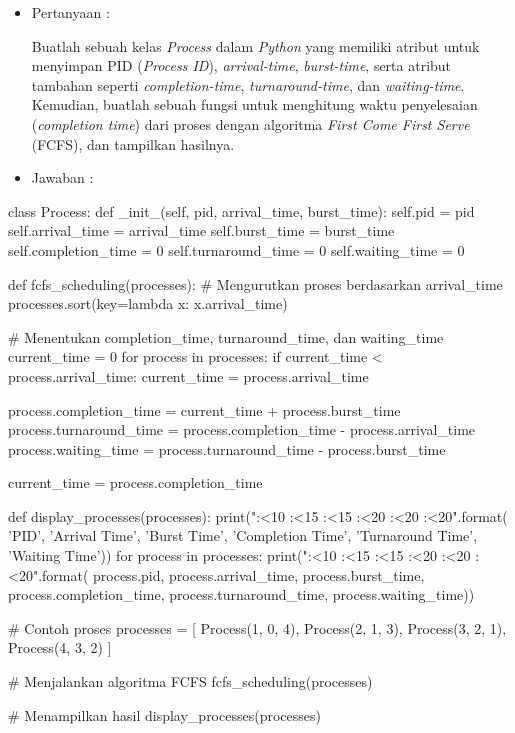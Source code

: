 \documentclass[12pt]{article}
\begin{document}
\begin{itemize}
    \item Pertanyaan :

    Buatlah sebuah kelas \textit{Process} dalam \textit{Python} yang memiliki atribut untuk menyimpan PID (\textit{Process ID}), \textit{arrival-time}, \textit{burst-time}, serta atribut tambahan seperti \textit{completion-time}, \textit{turnaround-time}, dan \textit{waiting-time}. Kemudian, buatlah sebuah fungsi untuk menghitung waktu penyelesaian (\textit{completion time}) dari proses dengan algoritma \textit{First Come First Serve} (FCFS), dan tampilkan hasilnya.
\end{itemize}
\begin{itemize}
 \item Jawaban :
\end{itemize}
\begin{python}
class Process:
def _init_(self, pid, arrival_time, burst_time):
        self.pid = pid
        self.arrival_time = arrival_time
        self.burst_time = burst_time
        self.completion_time = 0
        self.turnaround_time = 0
        self.waiting_time = 0

    def fcfs_scheduling(processes):
    # Mengurutkan proses berdasarkan arrival_time
    processes.sort(key=lambda x: x.arrival_time)
    
    # Menentukan completion_time, turnaround_time, dan waiting_time
    current_time = 0
    for process in processes:
        if current_time < process.arrival_time:
            current_time = process.arrival_time
        
        process.completion_time = current_time + process.burst_time
        process.turnaround_time = process.completion_time - process.arrival_time
        process.waiting_time = process.turnaround_time - process.burst_time
        
        current_time = process.completion_time

def display_processes(processes):
    print("{:<10} {:<15} {:<15} {:<20} {:<20} {:<20}".format(
        'PID', 'Arrival Time', 'Burst Time', 'Completion Time', 'Turnaround Time', 'Waiting Time'))
    for process in processes:
        print("{:<10} {:<15} {:<15} {:<20} {:<20} {:<20}".format(
            process.pid, process.arrival_time, process.burst_time, process.completion_time, process.turnaround_time, process.waiting_time))

# Contoh proses
processes = [
    Process(1, 0, 4),
    Process(2, 1, 3),
    Process(3, 2, 1),
    Process(4, 3, 2)
]

# Menjalankan algoritma FCFS
fcfs_scheduling(processes)

# Menampilkan hasil
display_processes(processes) 
\end{python}
\end{document}
